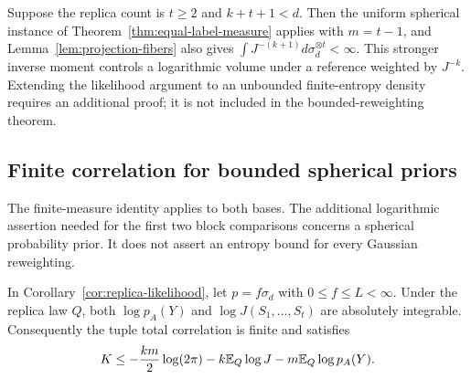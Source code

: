 \begin{remark}
\label{rem:extra-inverse-moment}
Suppose the replica count is $t\ge2$ and $k+t+1<d$. Then the uniform spherical
instance of Theorem~\ref{thm:equal-label-measure} applies with $m=t-1$, and
Lemma~\ref{lem:projection-fibers} also gives
$\int J^{-(k+1)}d\sigma_d^{\otimes t}<\infty$. This stronger inverse moment
controls a logarithmic volume
under a reference weighted by $J^{-k}$. Extending the likelihood argument
to an unbounded finite-entropy density requires an additional proof; it is
not included in the bounded-reweighting theorem.
\end{remark}

\subsection{Finite correlation for bounded spherical priors}

The finite-measure identity applies to both bases. The additional logarithmic
assertion needed for the first two block comparisons concerns a spherical
probability prior. It does not assert an entropy bound for every Gaussian
reweighting.

\begin{lemma}
\label{lem:replica-logs}
In Corollary~\ref{cor:replica-likelihood}, let $p=f\sigma_d$ with
$0\le f\le L<\infty$. Under the replica law $Q$, both $\log p_A(Y)$
and $\log J(S_1,\ldots,S_t)$ are absolutely integrable. Consequently the
tuple total correlation is finite and satisfies
\begin{equation}\label{eq:replica-correlation-upper}
 K\le -\frac{km}{2}\log(2\pi)-k\mathbb E_Q\log J-m\mathbb E_Q\log p_A(Y).
\end{equation}
\end{lemma}

